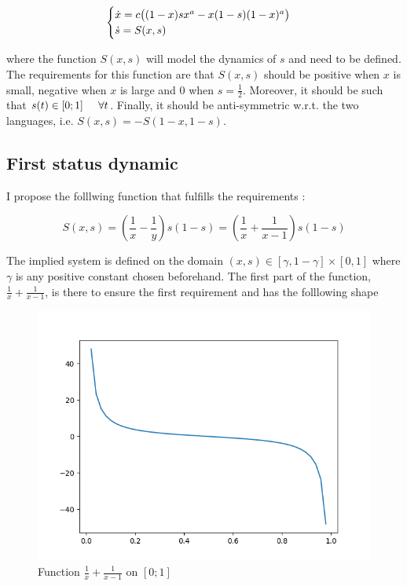 \documentclass{article}
\begin{document}
\begin{equation}
\label{eq:1dtemp}
\begin{cases}
\dot{x} = c\big( (1-x)sx^a - x(1-s)(1-x)^a \big) \\
\dot{s} = S(x, s) \\
\end{cases}
\end{equation}

where the function $S(x,s)$ will model the dynamics of $s$ and need to be defined.
The requirements for this function are that $S(x,s)$ should be positive when $x$ is small, negative when $x$ is large and $0$ when $s = \frac{1}{2}$.
Moreover, it should be such that $s(t) \in [0;1] \hspace{0.5cm} \forall{t}$.
Finally, it should be anti-symmetric w.r.t. the two languages, i.e. $S(x,s) = - S(1-x, 1-s)$.

\subsection*{First status dynamic}

I propose the folllwing function that fulfills the requirements :

\begin{equation}
\label{eq:sdyn1}
S(x,s) = (\frac{1}{x}-\frac{1}{y})s(1-s) = (\frac{1}{x}+\frac{1}{x-1})s(1-s)
\end{equation}

The implied system is defined on the domain $(x,s) \in [\gamma, 1-\gamma] \times [0,1]$ where $\gamma$ is any positive constant chosen beforehand.
The first part of the function, $\frac{1}{x}+\frac{1}{x-1}$, is there to ensure the first requirement and has the folllowing shape

\begin{figure}[H]
\centering
\includegraphics[scale=0.5]{functionofs.png}
\caption{Function $\frac{1}{x}+\frac{1}{x-1}$ on $[0;1]$}
\label{fig:functionofs}
\end{figure}
\end{document}
